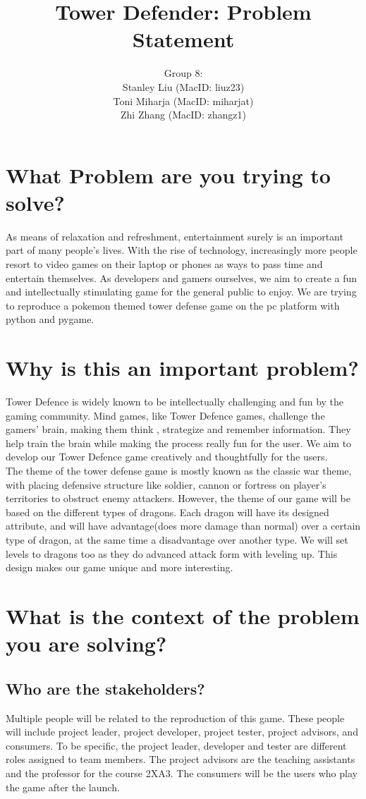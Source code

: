 \documentclass[12pt]{article}
\title{Tower Defender: Problem Statement}
\author{Group 8: \\
                 Stanley Liu (MacID: liuz23) \\    
                 Toni Miharja (MacID: miharjat)\\
                 Zhi Zhang (MacID: zhangz1)}
\begin{document}
\maketitle

\section {What Problem are you trying to solve?}
As means of relaxation and refreshment, entertainment surely is an important part of many people’s lives. With the rise of technology, increasingly more people resort to video games on their laptop or phones as ways to pass time and entertain themselves. As developers and gamers ourselves, we aim to create a fun and intellectually stimulating game for the general public to enjoy. We are trying to reproduce a pokemon themed tower defense game on the pc platform with python and pygame.

\section {Why is this an important problem?}
Tower Defence is widely known to be intellectually challenging and fun by the gaming community. Mind games, like Tower Defence games, challenge the gamers’ brain, making them think , strategize and remember information. They help train the brain while making the process really fun for the user. We aim to develop  our Tower Defence game creatively and thoughtfully for the users.\\The theme of the tower defense game is mostly known as the classic war theme, with placing defensive structure like soldier, cannon or fortress on player’s territories to obstruct enemy attackers. However, the theme of our game will be based on the different types of dragons. Each dragon will have its designed attribute, and will have advantage(does more damage than normal) over a certain type of dragon, at the same time a disadvantage over another type. We will set levels to dragons too as they do advanced attack form with leveling up. This design makes our game unique and more interesting.
\section {What is the context of the problem you are solving?}
    \subsection {Who are the stakeholders?}
    Multiple people will be related to the reproduction of this game. These people will include project leader, project developer, project tester, project advisors, and consumers. To be specific, the project leader, developer and tester are different roles assigned to team members. The project advisors are the teaching assistants and the professor for the course 2XA3. The consumers will be the users who play the game after the launch.
\end{document}
